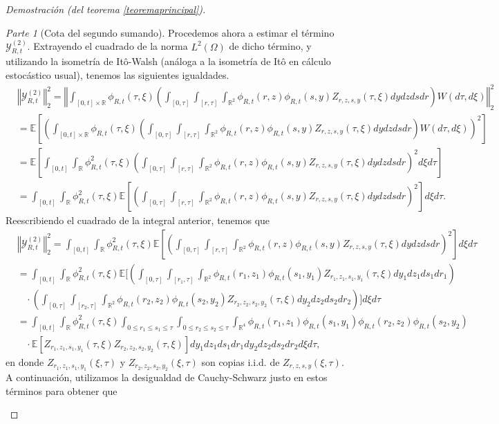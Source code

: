 \documentclass[letterpaper,twoside,12pt]{book}
\newcommand{\R}{\mathbb{R}}
\newcommand{\E}{\mathbb{E}}
\newcommand{\1}{\mathds{1}}
\newcommand{\norm}[1]{\left\Vert #1 \right\Vert}
\theoremstyle{definition}
\theoremstyle{definition}
\theoremstyle{remark}
\newtheorem{proofpart}{Parte}
\theoremstyle{definition}
\theoremstyle{definition}
\theoremstyle{definition}
\theoremstyle{definition}
\theoremstyle{definition}
\begin{document}
\begin{proof}[Demostración (del teorema \ref{teoremaprincipal})]
\begin{proofpart}[Cota del segundo sumando]
Procedemos ahora a estimar el término $\mathcal{Y}_{R,t}^{(2)}$. Extrayendo el cuadrado de la norma $L^{2}(\Omega)$ de dicho término, y utilizando la isometría de Itô-Walsh (análoga a la isometría de Itô en cálculo estocástico usual), tenemos las siguientes igualdades.
\begin{align*}
   &\norm{\mathcal{Y}_{R,t}^{(2)}}_2^{2}=\norm{\int_{[0,t]\times\R}\phi_{R,t}(\tau,\xi)\left(\int_{[0,\tau]}\int_{[r,\tau]}\int_{\R^2}\phi_{R,t}(r,z)\phi_{R,t}(s,y)Z_{r,z,s,y}(\tau,\xi)dy dz ds dr\right)W(d\tau,d\xi)}_2^2\\
   &=\E\left[\left(\int_{[0,t]\times\R}\phi_{R,t}(\tau,\xi)\left(\int_{[0,\tau]}\int_{[r,\tau]}\int_{\R^2}\phi_{R,t}(r,z)\phi_{R,t}(s,y)Z_{r,z,s,y}(\tau,\xi)dy dz ds dr\right)W(d\tau,d\xi)\right)^2\right]\\
   &=\E\left[\int_{[0,t]}\int_\R\phi_{R,t}^2(\tau,\xi)\left(\int_{[0,\tau]}\int_{[r,\tau]}\int_{\R^2}\phi_{R,t}(r,z)\phi_{R,t}(s,y)Z_{r,z,s,y}(\tau,\xi)dy dz ds dr\right)^2d\xi d\tau\right]\\
   &=\int_{[0,t]}\int_\R\phi_{R,t}^2(\tau,\xi)\E\left[\left(\int_{[0,\tau]}\int_{[r,\tau]}\int_{\R^2}\phi_{R,t}(r,z)\phi_{R,t}(s,y)Z_{r,z,s,y}(\tau,\xi)dy dz ds dr\right)^2\right]d\xi d\tau.
\end{align*}
Reescribiendo el cuadrado de la integral anterior, tenemos que 
\begin{align*}
   &\norm{\mathcal{Y}_{R,t}^{(2)}}_2^{2}=\int_{[0,t]}\int_\R\phi_{R,t}^2(\tau,\xi)\E\left[\left(\int_{[0,\tau]}\int_{[r,\tau]}\int_{\R^2}\phi_{R,t}(r,z)\phi_{R,t}(s,y)Z_{r,z,s,y}(\tau,\xi)dy dz ds dr\right)^2\right]d\xi d\tau\\
   &=\int_{[0,t]}\int_\R\phi_{R,t}^2(\tau,\xi)\E\Bigg[\left(\int_{[0,\tau]}\int_{[r_1,\tau]}\int_{\R^2}\phi_{R,t}(r_1,z_1)\phi_{R,t}(s_1,y_1)Z_{r_1,z_1,s_1,y_1}(\tau,\xi)dy_1dz_1ds_1dr_1\right)\\
   &\ \ \ \ \cdot \left(\int_{[0,\tau]}\int_{[r_2,\tau]}\int_{\R^2}\phi_{R,t}(r_2,z_2)\phi_{R,t}(s_2,y_2)Z_{r_2,z_2,s_2,y_2}(\tau,\xi)dy_2dz_2ds_2dr_2\right)\Bigg]d\xi d\tau\\
   &=\int_{[0,t]}\int_\R\phi_{R,t}^2(\tau,\xi)\int_{0\leq r_1\leq s_1\leq \tau}\int_{0\leq r_2\leq s_2\leq \tau}\int_{\R^4}\phi_{R,t}(r_1,z_1)\phi_{R,t}(s_1,y_1)\phi_{R,t}(r_2,z_2)\phi_{R,t}(s_2,y_2)\\
   &\ \ \ \ \cdot \E\left[Z_{r_1,z_1,s_1,y_1}(\tau,\xi)Z_{r_2,z_2,s_2,y_2}(\tau,\xi)\right]dy_1dz_1ds_1dr_1dy_2dz_2ds_2dr_2d\xi d\tau,
\end{align*}
en donde $Z_{r_1,z_1,s_1,y_1}(\xi,\tau)$ y $Z_{r_2,z_2,s_2,y_2}(\xi,\tau)$ son copias i.i.d. de $Z_{r,z,s,y}(\xi,\tau)$. A continuación, utilizamos la desigualdad de Cauchy-Schwarz justo en estos términos para obtener que 

\end{proofpart}
\end{proof}
\end{document}
